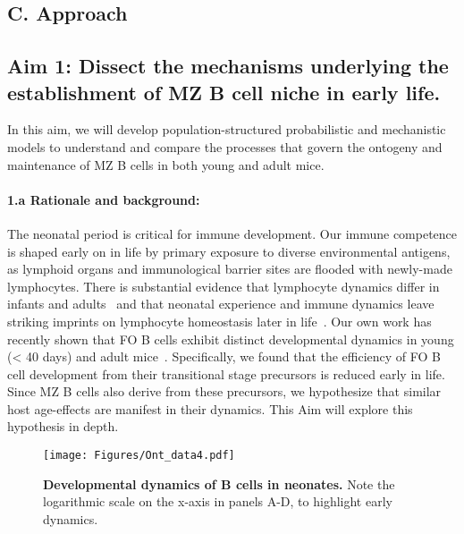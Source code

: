 \documentclass[11pt]{article}
\newcommand{\para}[1]{\vspace*{-4.5mm}\paragraph{#1}}
\begin{document}
    




\subsection*{C. Approach}
\vspace{-1mm}
\subsection*{Aim 1: Dissect the mechanisms underlying the establishment of MZ B cell niche in early life.}

In this aim, we will develop population-structured probabilistic and mechanistic models to understand and compare the processes that govern the ontogeny and maintenance of  MZ B cells in both young and adult mice.

\para{{1.a Rationale and background:}}
The neonatal period is critical for immune development.
Our immune competence is shaped early on in life by primary exposure to diverse environmental antigens, as lymphoid organs and immunological barrier sites are flooded with newly-made lymphocytes.
There is substantial evidence that lymphocyte dynamics differ in infants and adults~\cite{LeCampion_2002, Scho_nland_2003, Reynaldi_2019, Rane_2022} and that neonatal experience and immune dynamics leave striking imprints on lymphocyte homeostasis later in life~\cite{Farber_2013, Hogan_2019, Gaimann_2020, Davenport_2020}.  
Our own work has recently shown that FO B cells exhibit distinct developmental dynamics in young (< 40 days) and adult mice~\cite{Verheijen_2020}.
Specifically, we found that the efficiency of FO B cell development from their transitional stage precursors is reduced early in life. 
Since MZ B cells also derive from these precursors, we hypothesize that similar host age-effects are manifest in their dynamics.
This Aim will explore this hypothesis in depth.

\begin{wrapfigure}{r}{0.39\textwidth}
\centering
\vspace*{-6mm}
\texttt{[image: Figures/Ont\_data4.pdf]}
\vspace*{-2mm}
\caption{\textbf{Developmental dynamics of B cells in neonates.} 
Note the logarithmic scale on the x-axis in panels A-D, to highlight early dynamics.
}
\vspace*{-5mm}
\label{fig:Ont_data}\end{wrapfigure}
\end{document}
